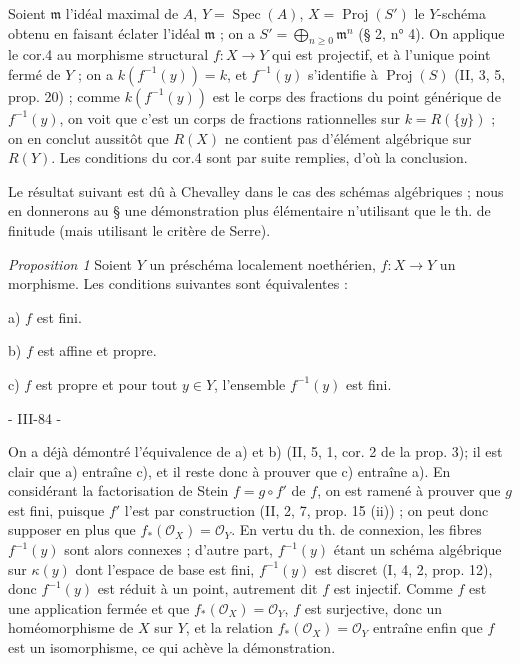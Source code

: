 Soient $\mathfrak{m}$ l'idéal maximal de $A$, $Y = \operatorname{Spec}(A)$, $X = \operatorname{Proj}(S')$ le $Y$-schéma obtenu en faisant éclater l'idéal $\mathfrak{m}$ ; on a $S' = \bigoplus_{n \ge 0} \mathfrak{m}^n$ (§ 2, n° 4). On applique le cor.4 au morphisme structural $f : X \to Y$ qui est projectif, et à l'unique point fermé de $Y$ ; on a $k(f^{-1}(y)) = k$, et $f^{-1}(y)$ s'identifie à $\operatorname{Proj}(S)$ (II, 3, 5, prop. 20) ; comme $k(f^{-1}(y))$ est le corps des fractions du point générique de $f^{-1}(y)$, on voit que c'est un corps de fractions rationnelles sur $k = R(\{y\})$ ; on en conclut aussitôt que $R(X)$ ne contient pas d'élément algébrique sur $R(Y)$. Les conditions du cor.4 sont par suite remplies, d'où la conclusion.

Le résultat suivant est dû à  Chevalley dans le cas des schémas algébriques ; nous en donnerons au § une démonstration plus élémentaire n'utilisant que le th. de finitude (mais utilisant le critère de Serre).

\emph{Proposition 1} Soient $Y$ un préschéma localement noethérien, $f : X \to Y$ un morphisme. Les conditions suivantes sont équivalentes :

a) $f$ est fini.

b) $f$ est affine et propre.

c) $f$ est propre et pour tout $y \in Y$, l'ensemble $f^{-1}(y)$ est fini.

\newpage


\noindent - III-84 -

On a déjà démontré l'équivalence de a) et b) (II, 5, 1, cor. 2 de la prop. 3); il est clair que a) entraîne c), et il reste donc à prouver que c) entraîne a). En considérant la factorisation de Stein $f=g \circ f'$ de $f$, on est ramené à prouver que $g$ est fini, puisque $f'$ l'est par construction (II, 2, 7, prop. 15 (ii)) ; on peut donc supposer en plus que $f_*(\mathcal{O}_X) = \mathcal{O}_Y$. En vertu du th. de connexion, les fibres $f^{-1}(y)$ sont alors connexes ; d'autre part, $f^{-1}(y)$ étant un schéma algébrique sur $\kappa(y)$ dont l'espace de base est fini, $f^{-1}(y)$ est discret (I, 4, 2, prop. 12), donc $f^{-1}(y)$ est réduit à un point, autrement dit $f$ est injectif. Comme $f$ est une application fermée et que $f_*(\mathcal{O}_X) = \mathcal{O}_Y$, $f$ est surjective, donc un homéomorphisme de $X$ sur $Y$, et la relation $f_*(\mathcal{O}_X) = \mathcal{O}_Y$ entraîne enfin que $f$ est un isomorphisme, ce qui achève la démonstration.

